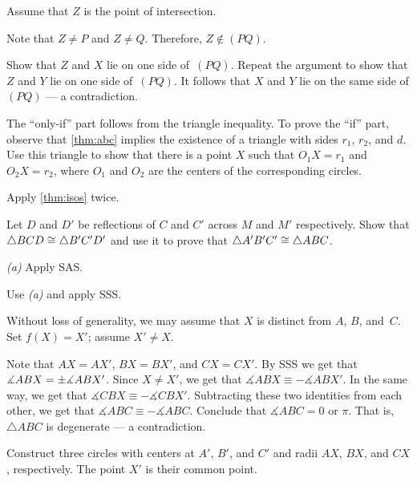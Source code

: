 Assume that $Z$ is the point of intersection.

Note that $Z\ne P$ and $Z\ne Q$.
Therefore, $Z\notin (PQ)$.

Show that $Z$ and $X$ lie on one side of~$(PQ)$.
Repeat the argument to show that $Z$ and $Y$ lie on one side of~$(PQ)$.
It follows that $X$ and $Y$ lie on the same side of $(PQ)$ --- a contradiction.

 The ``only-if'' part follows from the triangle inequality.
To prove the ``if'' part,  
observe that \ref{thm:abc} implies the existence of a triangle with sides $r_1$, $r_2$, and $d$.
Use this triangle to show that there is a point $X$ such that $O_1X=r_1$ and $O_2X=r_2$, where $O_1$ and $O_2$ are the centers of the corresponding circles.

\setcounter{eqtn}{0}

Apply \ref{thm:isos} twice.

Let $D$ and $D'$ be reflections of
$C$ and $C'$ across $M$ and $M'$ respectively.
Show that $\triangle BCD\cong \triangle B'C'D'$ and use it to prove that $\triangle A' B' C'\cong\triangle A B C$.

 \textit{(a)} Apply SAS.

 Use \textit{(a)} and apply SSS.

Without loss of generality, we may assume that $X$ is distinct from $A$, $B$, and~$C$.
Set $f(X)=X'$; assume $X'\ne X$.

Note that $AX=AX'$, $BX=BX'$, and $CX=CX'$.
By SSS we get that $\measuredangle ABX=\pm\measuredangle ABX'$.
Since $X\ne X'$, we get that
$\measuredangle ABX\equiv - \measuredangle ABX'$.
In the same way, we get that 
$\measuredangle CBX\equiv - \measuredangle CBX'$.
Subtracting these two identities from each other, we get that
$\measuredangle ABC\equiv -\measuredangle ABC$.
Conclude that $\measuredangle ABC=0$ or $\pi$.
That is, $\triangle ABC$ is degenerate --- a contradiction. 

 Construct three circles with centers at $A'$, $B'$, and $C'$ and radii $AX$, $BX$, and $CX$, respectively.
The point $X'$ is their common point.

